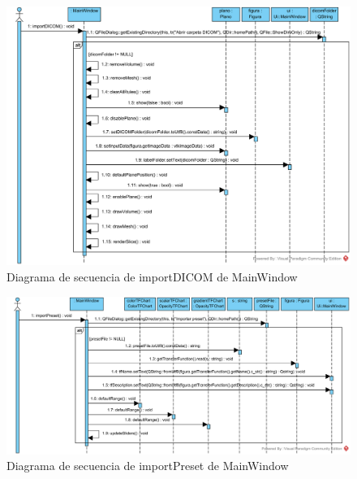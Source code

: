 \begin{figure}[H]
	\centering
	\includegraphics[width=12cm]{imagenes/diagramas/secuencia/MainWindow_ImportDICOM}
	\caption{Diagrama de secuencia de importDICOM de MainWindow}
	\label{fig:diagrama_secuencia_mainWindow_importDICOM}
\end{figure}

\begin{figure}[H]
	\centering
	\includegraphics[width=12cm]{imagenes/diagramas/secuencia/MainWindow_ImportPreset}
	\caption{Diagrama de secuencia de importPreset de MainWindow}
	\label{fig:diagrama_secuencia_mainWindow_importPreset}
\end{figure}

